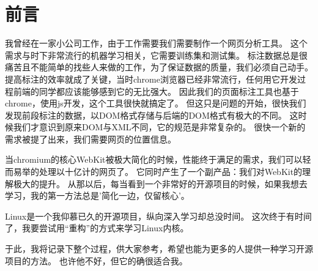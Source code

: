 \chapter{前言}
我曾经在一家小公司工作，由于工作需要我们需要制作一个网页分析工具。
这个需求与时下非常流行的机器学习相关，它需要训练集和测试集。
标注数据总是很痛苦且不能简单的找些人来做的工作，为了保证数据的质量，我们必须自己动手。
提高标注的效率就成了关键，当时chrome浏览器已经非常流行，任何用它开发过程前端的同学都应该能够感到它的无比强大。
因此我们的页面标注工具也基于chrome，使用js开发，这个工具很快就搞定了。
但这只是问题的开始，很快我们发现前段标注的数据，以DOM格式存储与后端的DOM格式有极大的不同。
这时候我们才意识到原来DOM与XML不同，它的规范是非常复杂的。
很快一个新的需求被提了出来，我们需要网页的位置信息。


当chromium的核心WebKit被极大简化的时候，性能终于满足的需求，我们可以轻而易举的处理以十亿计的网页了。
它同时产生了一个副产品：我们对WebKit的理解极大的提升。
从那以后，每当看到一个非常好的开源项目的时候，如果我想去学习，我的第一方法总是'简化一边，仅留核心'。


Linux是一个我仰慕已久的开源项目，纵向深入学习却总没时间。
这次终于有时间了，我要尝试用“重构”的方式来学习Linux内核。

于此，我将记录下整个过程，供大家参考，希望也能为更多的人提供一种学习开源项目的方法。
也许他不好，但它的确很适合我。
